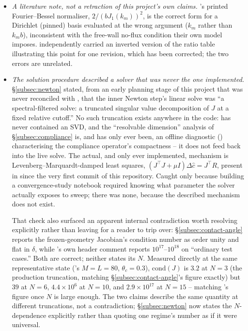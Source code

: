 \begin{itemize}
\item \emph{A literature note, not a retraction of this project's own claims.} \cite{AlventosaEtAl2023}'s printed Fourier--Bessel normaliser, $2/(bJ_1(k_m))^2$, is the correct form for a Dirichlet (pinned) basis evaluated at the wrong argument ($k_m$ rather than $k_mb$), inconsistent with the free-wall no-flux condition their own model imposes.  independently carried an inverted version of the ratio table illustrating this point for one revision, which has been corrected; the two errors are unrelated.
\item \emph{The solution procedure described a solver that was never the one implemented.} \S\ref{subsec:newton} stated, from an early planning stage of this project that was never reconciled with , that the inner Newton step's linear solve was ``a spectral-filtered solve: a truncated singular value decomposition of $J$ at a fixed relative cutoff.'' No such truncation exists anywhere in the code:  has never contained an SVD, and the ``resolvable dimension'' analysis of \S\ref{subsec:compliance} is, and has only ever been, an offline diagnostic () characterising the compliance operator's compactness -- it does not feed back into the live solve. The actual, and only ever implemented, mechanism is Levenberg--Marquardt-damped least squares, $(J^\top J+\mu I)\Delta\hat c=J^\top R$, present in  since the very first commit of this repository. Caught only because building a convergence-study notebook required knowing what parameter the solver actually exposes to sweep; there was none, because the described mechanism does not exist.

That check also surfaced an apparent internal contradiction worth resolving explicitly rather than leaving for a reader to trip over: \S\ref{subsec:contact-angle} reports the frozen-geometry Jacobian's condition number as order unity and flat in $\delta$, while 's own header comment reports $10^{17}$--$10^{18}$ on ``ordinary test cases.'' Both are correct; neither states its $N$. Measured directly at the same representative state ('s $M=L=80$, $\theta_c=0.3$), $\mathrm{cond}(J)$ is $3.2$ at $N=3$ (the production truncation, matching \S\ref{subsec:contact-angle}'s figure exactly) but $39$ at $N=6$, $4.4\times10^6$ at $N=10$, and $2.9\times10^{17}$ at $N=15$ -- matching 's figure once $N$ is large enough. The two claims describe the same quantity at different truncations, not a contradiction; \S\ref{subsec:newton} now states the $N$-dependence explicitly rather than quoting one regime's number as if it were universal.
\end{itemize}

